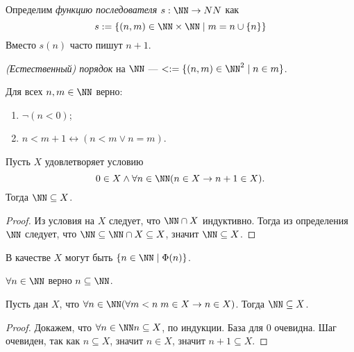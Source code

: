 \documentclass[12pt,a4paper]{article}
\begin{document}
    \begin{definition}
        Определим \emph{функцию последователя} $s: \NN \to NN$ как
        \[s := \{(n, m) \in \NN \times \NN \mid m = n \cup \{n\}\}\]
        Вместо $s(n)$ часто пишут $n+1$.
    \end{definition}

    \begin{definition}
        \emph{(Естественный) порядок} на $\NN$ --- $< := \{(n, m) \in \NN^2 \mid n \in m\}$.
    \end{definition}

    \begin{remark}
        Для всех $n, m \in \NN$ верно:
        \begin{enumerate}
            \item $\neg (n < 0)$;
            \item $n < m + 1 \leftrightarrow (n < m \vee n = m)$.
        \end{enumerate}
    \end{remark}

    \begin{theorem}
        Пусть $X$ удовлетворяет условию
        \[0 \in X \wedge \forall n \in \NN (n \in X \rightarrow n + 1 \in X).\]
        Тогда $\NN \subseteq X$.
    \end{theorem}

    \begin{proof}
        Из условия на $X$ следует, что $\NN \cap X$ индуктивно. Тогда из определения $\NN$ следует, что $\NN \subseteq \NN \cap X \subseteq X$, значит $\NN \subseteq X$.
    \end{proof}

    \begin{remark}
        В качестве $X$ могут быть $\{n \in \NN \mid \Phi(n)\}$.
    \end{remark}

    \begin{corollary}
        $\forall n \in \NN$ верно $n \subseteq \NN$.
    \end{corollary}

    \begin{theorem}
        Пусть дан $X$, что $\forall n \in \NN (\forall m < n\; m \in X \rightarrow n \in X)$. Тогда $\NN \subseteq X$.
    \end{theorem}

    \begin{proof}
        Докажем, что $\forall n \in \NN n \subseteq X$, по индукции. База для $0$ очевидна. Шаг очевиден, так как $n \subseteq X$, значит $n \in X$, значит $n + 1 \subseteq X$.  
    \end{proof}
\end{document}
